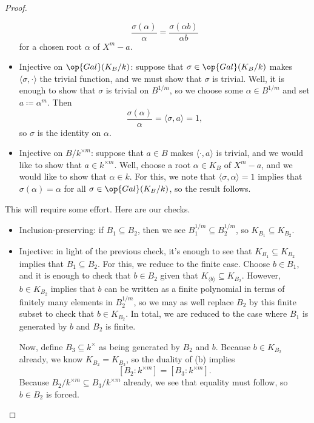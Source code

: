 \documentclass[../notes.tex]{subfiles}
\begin{document}
\begin{proof}
\begin{listalph}
\begin{itemize}
			\[\frac{\sigma\left(\alpha\right)}{\alpha}=\frac{\sigma(\alpha b)}{\alpha b}\]
			for a chosen root $\alpha$ of $X^m-a$.
			\item Injective on $\op{Gal}(K_B/k)$: suppose that $\sigma\in\op{Gal}(K_B/k)$ makes $\langle\sigma,\cdot\rangle$ the trivial function, and we must show that $\sigma$ is trivial. Well, it is enough to show that $\sigma$ is trivial on $B^{1/m}$, so we choose some $\alpha\in B^{1/m}$ and set $a\coloneqq\alpha^m$. Then
			\[\frac{\sigma(\alpha)}{\alpha}=\langle\sigma,a\rangle=1,\]
			so $\sigma$ is the identity on $\alpha$.
			\item Injective on $B/k^{\times m}$: suppose that $a\in B$ makes $\langle\cdot,a\rangle$ is trivial, and we would like to show that $a\in k^{\times m}$. Well, choose a root $\alpha\in K_B$ of $X^m-a$, and we would like to show that $\alpha\in k$. For this, we note that $\langle\sigma,\alpha\rangle=1$ implies that $\sigma(\alpha)=\alpha$ for all $\sigma\in\op{Gal}(K_B/k)$, so the result follows.
		\end{itemize}
		\item This will require some effort. Here are our checks.
		\begin{itemize}
			\item Inclusion-preserving: if $B_1\subseteq B_2$, then we see $B_1^{1/m}\subseteq B_2^{1/m}$, so $K_{B_1}\subseteq K_{B_2}$.

			\item Injective: in light of the previous check, it's enough to see that $K_{B_1}\subseteq K_{B_2}$ implies that $B_1\subseteq B_2$. For this, we reduce to the finite case. Choose $b\in B_1$, and it is enough to check that $b\in B_2$ given that $K_{\langle b\rangle}\subseteq K_{B_2}$. However, $b\in K_{B_2}$ implies that $b$ can be written as a finite polynomial in terms of finitely many elements in $B_2^{1/m}$, so we may as well replace $B_2$ by this finite subset to check that $b\in K_{B_2}$. In total, we are reduced to the case where $B_1$ is generated by $b$ and $B_2$ is finite.

			Now, define $B_3\subseteq k^\times$ as being generated by $B_2$ and $b$. Because $b\in K_{B_2}$ already, we know $K_{B_2}=K_{B_3}$, so the duality of (b) implies
			\[[B_2:k^{\times m}]=[B_3:k^{\times m}].\]
			Because $B_2/k^{\times m}\subseteq B_3/k^{\times m}$ already, we see that equality must follow, so $b\in B_2$ is forced.


\end{itemize}
\end{listalph}
\end{proof}
\end{document}
